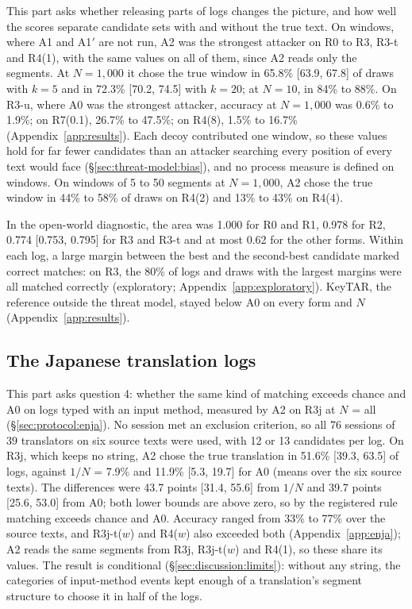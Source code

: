 This part asks whether releasing parts of logs changes the picture, and how well the scores separate candidate sets
with and without the true text. On windows, where A1 and A1$'$ are not run, A2 was the strongest attacker on R0 to R3,
R3-t and R4(1), with the same values on all of them, since A2 reads only the segments. At $N = 1{,}000$ it chose the
true window in 65.8\% [63.9, 67.8] of draws with $k = 5$ and in 72.3\% [70.2, 74.5] with $k = 20$; at $N = 10$, in 84\%
to 88\%. On R3-u, where A0 was the strongest attacker, accuracy at $N = 1{,}000$ was 0.6\% to 1.9\%; on R7(0.1), 26.7\%
to 47.5\%; on R4(8), 1.5\% to 16.7\% (Appendix~\ref{app:results}). Each decoy contributed one window, so these values
hold for far fewer candidates than an attacker searching every position of every text would face
(\S\ref{sec:threat-model:bias}), and no process measure is defined on windows. On windows of 5 to 50 segments at $N = 1{,}000$, A2
chose the true window in 44\% to 58\% of draws on R4(2) and 13\% to 43\% on R4(4).

In the open-world diagnostic, the area was 1.000 for R0 and R1, 0.978 for R2, 0.774 [0.753, 0.795] for R3 and R3-t
and at most 0.62 for the other forms. Within each log, a large margin between the best and the second-best candidate
marked correct matches: on R3, the 80\% of logs and draws with the largest margins were all matched correctly
(exploratory; Appendix~\ref{app:exploratory}). KeyTAR, the reference outside the threat model, stayed
below A0 on every form and $N$ (Appendix~\ref{app:results}).

\subsection{The Japanese translation logs}
\label{sec:results:enja}

This part asks question 4: whether the same kind of matching exceeds chance and A0 on logs typed with an input method,
measured by A2 on R3j at $N$ = all (\S\ref{sec:protocol:enja}). No session met an exclusion criterion, so all 76
sessions of 39 translators on six source texts were used, with 12 or 13 candidates per log. On R3j, which keeps no
string, A2 chose the true translation in 51.6\% [39.3, 63.5] of logs, against $1/N$ = 7.9\% and 11.9\% [5.3, 19.7] for
A0 (means over the six source texts). The differences were 43.7 points [31.4, 55.6] from $1/N$ and 39.7 points [25.6, 53.0] from A0; both lower bounds
are above zero, so by the registered rule matching exceeds chance and A0. Accuracy ranged from 33\% to
77\% over the source texts, and R3j-t($w$) and R4($w$) also exceeded both (Appendix~\ref{app:enja}); A2 reads the same
segments from R3j, R3j-t($w$) and R4(1), so these share its values. The result is
conditional (\S\ref{sec:discussion:limits}): without any string, the categories of input-method events kept enough
of a translation's segment structure to choose it in half of the logs.


